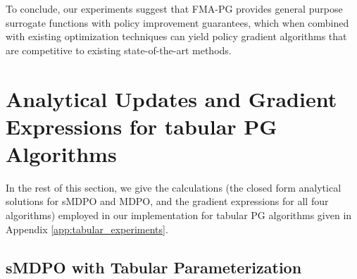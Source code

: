 \documentclass[a4paper, 10pt]{article}
\begin{document}
To conclude, our experiments suggest that FMA-PG provides general purpose surrogate functions with policy improvement guarantees, which when combined with existing optimization techniques can yield policy gradient algorithms that are competitive to existing state-of-the-art methods.

\newpage
\section{Analytical Updates and Gradient Expressions for tabular PG Algorithms} \label{app:tabular_derivations}
In the rest of this section, we give the calculations (the closed form analytical solutions for sMDPO and MDPO, and the gradient expressions for all four algorithms) employed in our implementation for tabular PG algorithms given in Appendix \ref{app:tabular_experiments}.

\subsection{sMDPO with Tabular Parameterization}
\end{document}
